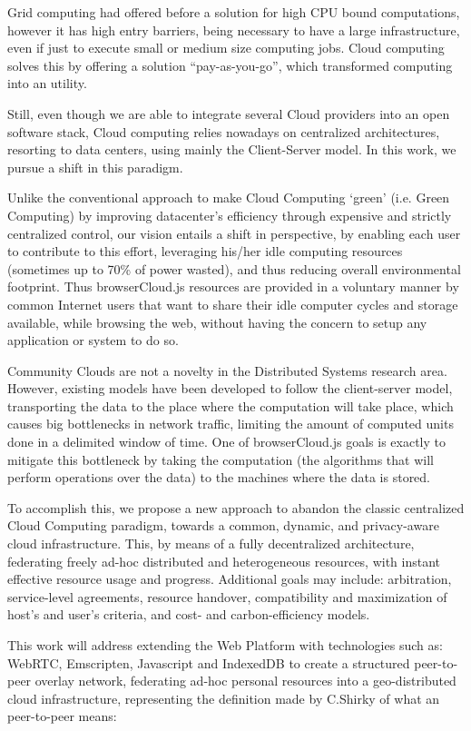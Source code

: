Grid computing had offered before a solution for high CPU bound computations, however it has high entry barriers, being necessary to have a large infrastructure, even if just to execute small or medium size computing jobs. Cloud computing solves this by offering a solution ``pay-as-you-go'', which transformed computing into an utility.

Still, even though we are able to integrate several Cloud providers into an open software stack, Cloud computing relies nowadays on centralized architectures, resorting to data centers, using mainly the Client-Server model. In this work, we pursue a shift in this paradigm.

Unlike the conventional approach to make Cloud Computing `green' (i.e. Green Computing) by improving datacenter's efficiency through expensive and strictly centralized control, our vision entails a shift in perspective, by enabling each user to contribute to this effort, leveraging his/her idle computing resources (sometimes up to 70\% of power wasted), and thus reducing overall environmental footprint. Thus browserCloud.js resources are provided in a voluntary manner by common Internet users that want to share their idle computer cycles and storage available, while browsing the web, without having the concern to setup any application or system to do so.

Community Clouds are not a novelty in the Distributed Systems research area. However, existing models have been developed to follow the client-server model, transporting the data to the place where the computation will take place, which causes big bottlenecks in network traffic, limiting the amount of computed units done in a delimited window of time. One of browserCloud.js goals is exactly to mitigate this bottleneck by taking the computation (the algorithms that will perform operations over the data) to the machines where the data is stored.

To accomplish this, we propose a new approach to abandon the classic centralized Cloud Computing paradigm, towards a common, dynamic, and privacy-aware cloud infrastructure. This, by means of a fully decentralized architecture, federating freely ad-hoc distributed and heterogeneous resources, with instant effective resource usage and progress. Additional goals may include: arbitration, service-level agreements, resource handover, compatibility and maximization of host's and user's criteria, and cost- and carbon-efficiency models.

This work will address extending the Web Platform with technologies such as: WebRTC, Emscripten, Javascript and IndexedDB to create a structured peer-to-peer overlay network, federating ad-hoc personal resources into a geo-distributed cloud infrastructure, representing the definition made by C.Shirky of what an peer-to-peer means:

